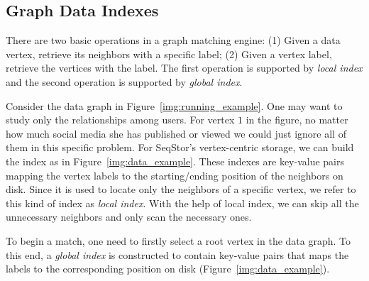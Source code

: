 \subsection{Graph Data Indexes}
There are two basic operations in a graph matching engine:
(1) Given a data vertex, retrieve its neighbors with a specific label;
(2) Given a vertex label, retrieve the vertices with the label. The first operation is supported by \emph{local index} and the second operation is supported by \emph{global index}.

Consider the data graph in Figure~\ref{img:running_example}.
One may want to study only the relationships among users.
For vertex $1$ in the figure,
no matter how much social media she has published or viewed we could just ignore all of them in this specific problem.
For SeqStor's vertex-centric storage,
we can build the index as in Figure~\ref{img:data_example}.
These indexes are key-value pairs mapping the vertex labels to the starting/ending position of the neighbors on disk.
Since it is used to locate only the neighbors of a specific vertex, we refer to this kind of index as \emph{local index}.
With the help of local index, we can skip all the unnecessary neighbors and only scan the necessary ones.


To begin a match, one need to firstly select a root vertex in the data graph.
To this end, a \emph{global index} is constructed to contain key-value pairs that maps the labels to the corresponding position on disk (Figure~\ref{img:data_example}).

